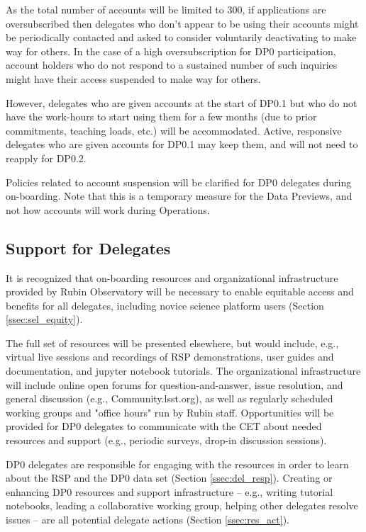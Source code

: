 \documentclass[DM,lsstdraft,authoryear,toc]{lsstdoc}
\begin{document}
As the total number of accounts will be limited to 300, if applications are oversubscribed then delegates who don't appear to be using their accounts might be periodically contacted and asked to consider voluntarily deactivating to make way for others.
In the case of a high oversubscription for DP0 participation, account holders who do not respond to a sustained number of such inquiries might have their access suspended to make way for others.

However, delegates who are given accounts at the start of DP0.1 but who do not have the work-hours to start using them for a few months (due to prior commitments, teaching loads, etc.) will be accommodated. 
Active, responsive delegates who are given accounts for DP0.1 may keep them, and will not need to reapply for DP0.2.

Policies related to account suspension will be clarified for DP0 delegates during on-boarding.
Note that this is a temporary measure for the Data Previews, and not how accounts will work during Operations.

\subsection{Support for Delegates}\label{ssec:res_sup}

It is recognized that on-boarding resources and organizational infrastructure provided by Rubin Observatory will be necessary to enable equitable access and benefits for all delegates, including novice science platform users (Section \ref{ssec:sel_equity}). 

The full set of resources will be presented elsewhere, but would include, e.g., virtual live sessions and recordings of RSP demonstrations, user guides and documentation, and jupyter notebook tutorials.
The organizational infrastructure will include online open forums for question-and-answer, issue resolution, and general discussion (e.g., Community.lsst.org), as well as regularly scheduled working groups and "office hours" run by Rubin staff.
Opportunities will be provided for DP0 delegates to communicate with the CET about needed resources and support (e.g., periodic surveys, drop-in discussion sessions).

DP0 delegates are responsible for engaging with the resources in order to learn about the RSP and the DP0 data set (Section \ref{ssec:del_resp}).
Creating or enhancing DP0 resources and support infrastructure -- e.g., writing tutorial notebooks, leading a collaborative working group, helping other delegates resolve issues -- are all potential delegate actions (Section \ref{ssec:res_act}).
\end{document}
